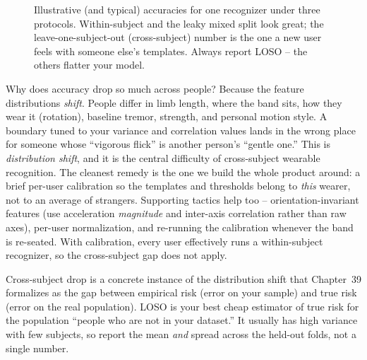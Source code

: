 \begin{figure}[H]
\centering
{}
\caption{Illustrative (and typical) accuracies for one recognizer under three
protocols. Within-subject and the leaky mixed split look great; the
leave-one-subject-out (cross-subject) number is the one a new user feels with
someone else's templates. Always report LOSO -- the others flatter your model.}
\label{ch38:fig-loso}
\end{figure}

\begin{whybox}
Why does accuracy drop so much across people? Because the feature distributions
\emph{shift}. People differ in limb length, where the band sits, how they wear it
(rotation), baseline tremor, strength, and personal motion style. A boundary
tuned to your variance and correlation values lands in the wrong place for
someone whose ``vigorous flick'' is another person's ``gentle one.'' This is
\emph{distribution shift}, and it is the central difficulty of cross-subject
wearable recognition. The cleanest remedy is the one we build the whole product
around: a brief per-user calibration so the templates and thresholds belong to
\emph{this} wearer, not to an average of strangers. Supporting tactics help too --
orientation-invariant features (use acceleration \emph{magnitude} and inter-axis
correlation rather than raw axes), per-user normalization, and re-running the
calibration whenever the band is re-seated. With calibration, every user
effectively runs a within-subject recognizer, so the cross-subject gap does not
apply.
\end{whybox}

\begin{connectionbox}
Cross-subject drop is a concrete instance of the distribution shift that Chapter~39 formalizes as the gap between empirical risk (error on
your sample) and true risk (error on the real population). LOSO is your best cheap
estimator of true risk for the population ``people who are not in your dataset.''
It usually has high variance with few subjects, so report the mean \emph{and}
spread across the held-out folds, not a single number.
\end{connectionbox}

